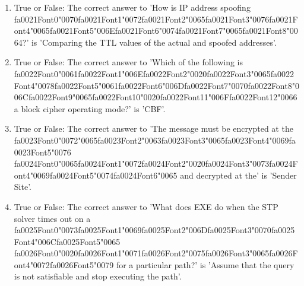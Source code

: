 \documentclass[12pt]{article}
\begin{document}
\begin{enumerate}[label=\arabic*.]
\item True or False: The correct answer to 'How is IP address spoofing {\csname fa0021Font0\endcsname\char"0070}{\csname fa0021Font1\endcsname\char"0072}{\csname fa0021Font2\endcsname\char"0065}{\csname fa0021Font3\endcsname\char"0076}{\csname fa0021Font4\endcsname\char"0065}{\csname fa0021Font5\endcsname\char"006E}{\csname fa0021Font6\endcsname\char"0074}{\csname fa0021Font7\endcsname\char"0065}{\csname fa0021Font8\endcsname\char"0064}?' is 'Comparing the TTL values of the actual and spoofed addresses'.
\item True or False: The correct answer to 'Which of the following is {\csname fa0022Font0\endcsname\char"0061}{\csname fa0022Font1\endcsname\char"006E}{\csname fa0022Font2\endcsname\char"0020}{\csname fa0022Font3\endcsname\char"0065}{\csname fa0022Font4\endcsname\char"0078}{\csname fa0022Font5\endcsname\char"0061}{\csname fa0022Font6\endcsname\char"006D}{\csname fa0022Font7\endcsname\char"0070}{\csname fa0022Font8\endcsname\char"006C}{\csname fa0022Font9\endcsname\char"0065}{\csname fa0022Font10\endcsname\char"0020}{\csname fa0022Font11\endcsname\char"006F}{\csname fa0022Font12\endcsname\char"0066} a block cipher operating mode?' is 'CBF'.
\item True or False: The correct answer to 'The message must be encrypted at the {\csname fa0023Font0\endcsname\char"0072}{\char"0065}{\csname fa0023Font2\endcsname\char"0063}{\csname fa0023Font3\endcsname\char"0065}{\csname fa0023Font4\endcsname\char"0069}{\csname fa0023Font5\endcsname\char"0076} {\csname fa0024Font0\endcsname\char"0065}{\csname fa0024Font1\endcsname\char"0072}{\csname fa0024Font2\endcsname\char"0020}{\csname fa0024Font3\endcsname\char"0073}{\csname fa0024Font4\endcsname\char"0069}{\csname fa0024Font5\endcsname\char"0074}{\csname fa0024Font6\endcsname\char"0065} and decrypted at the' is 'Sender Site'.
\item True or False: The correct answer to 'What does EXE do when the STP solver times out on a {\csname fa0025Font0\endcsname\char"0073}{\csname fa0025Font1\endcsname\char"0069}{\csname fa0025Font2\endcsname\char"006D}{\csname fa0025Font3\endcsname\char"0070}{\csname fa0025Font4\endcsname\char"006C}{\csname fa0025Font5\endcsname\char"0065} {\csname fa0026Font0\endcsname\char"0020}{\csname fa0026Font1\endcsname\char"0071}{\csname fa0026Font2\endcsname\char"0075}{\csname fa0026Font3\endcsname\char"0065}{\csname fa0026Font4\endcsname\char"0072}{\csname fa0026Font5\endcsname\char"0079} for a particular path?' is 'Assume that the query is not satisfiable and stop executing the path'.
\end{enumerate}
\end{document}
